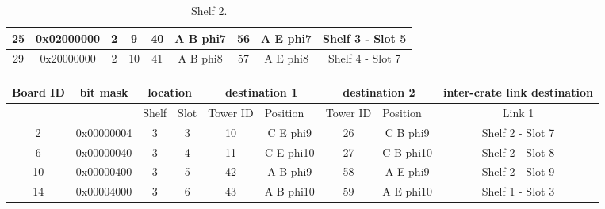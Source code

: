 \documentclass[11pt,letterpaper]{article}
\begin{document}
\begin{table}[h]
\begin{tabular}{|c|c|c|c|c|c|c|c|c|}
25                     & 0x02000000            & 2                          & 9                         & 40                            & A B phi7                      & 56                            & A E phi7                      & Shelf 3 - Slot 5             \\ \hline
29                     & 0x20000000            & 2                          & 10                        & 41                            & A B phi8                      & 57                            & A E phi8                      & Shelf 4 - Slot 7             \\ \hline
\end{tabular}
\caption{Shelf 2.}
\label{tab:shelf2}
\end{table}


\begin{table}[h]
\centering
\tiny
\begin{tabular}{|c|c|c|c|c|c|c|c|c|}
\hline
Board ID               & bit mask              & \multicolumn{2}{c|}{location}                          & \multicolumn{2}{c|}{destination 1}                            & \multicolumn{2}{c|}{destination 2}                            & inter-crate link destination \\ \hline
\multicolumn{1}{|l|}{} & \multicolumn{1}{l|}{} & \multicolumn{1}{l|}{Shelf} & \multicolumn{1}{l|}{Slot} & \multicolumn{1}{l|}{Tower ID} & \multicolumn{1}{l|}{Position} & \multicolumn{1}{l|}{Tower ID} & \multicolumn{1}{l|}{Position} & Link 1                       \\ \hline
2                      & 0x00000004            & 3                          & 3                         & 10                            & C E phi9                      & 26                            & C B phi9                      & Shelf 2 - Slot 7             \\ \hline
6                      & 0x00000040            & 3                          & 4                         & 11                            & C E phi10                     & 27                            & C B phi10                     & Shelf 2 - Slot 8             \\ \hline
10                     & 0x00000400            & 3                          & 5                         & 42                            & A B phi9                      & 58                            & A E phi9                      & Shelf 2 - Slot 9             \\ \hline
14                     & 0x00004000            & 3                          & 6                         & 43                            & A B phi10                     & 59                            & A E phi10                     & Shelf 1 - Slot 3             \\ \hline

\end{tabular}
\end{table}
\end{document}
